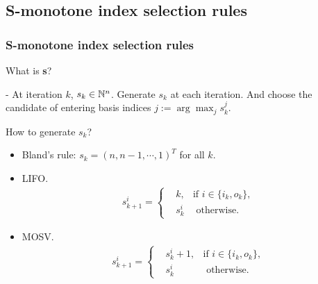 \documentclass{beamer}
\begin{document}
\subsection{S-monotone index selection rules}
\begin{frame}
\frametitle{S-monotone index selection rules\cite{csizmadia2012s}}
What is \textbf{s}?

- At iteration $k$, $s_k \in \mathbb{N}^{n}$. Generate $s_k$ at each iteration. And choose the candidate of entering basis indices $j := \arg \max_j {s_k^j}$.

How to generate $s_k$?

\begin{itemize}
\item Bland's rule: $s_k = (n, n-1, \cdots, 1)^T$ for all $k$.
\item LIFO. \begin{align*}
s_{k+1}^i = \left\{
\begin{aligned}
&k, & \text{if } i \in \{i_k, o_k\},\\
&s_k^i & \text{ otherwise}. 
\end{aligned}
\right.
\end{align*}
\item MOSV. \begin{align*}
s_{k+1}^i = \left\{
\begin{aligned}
&s_k^{i} + 1, & \text{if } i \in \{i_k, o_k\},\\
&s_k^i & \text{ otherwise}. 
\end{aligned}
\right.
\end{align*}
\end{itemize}
\end{frame}
\end{document}
